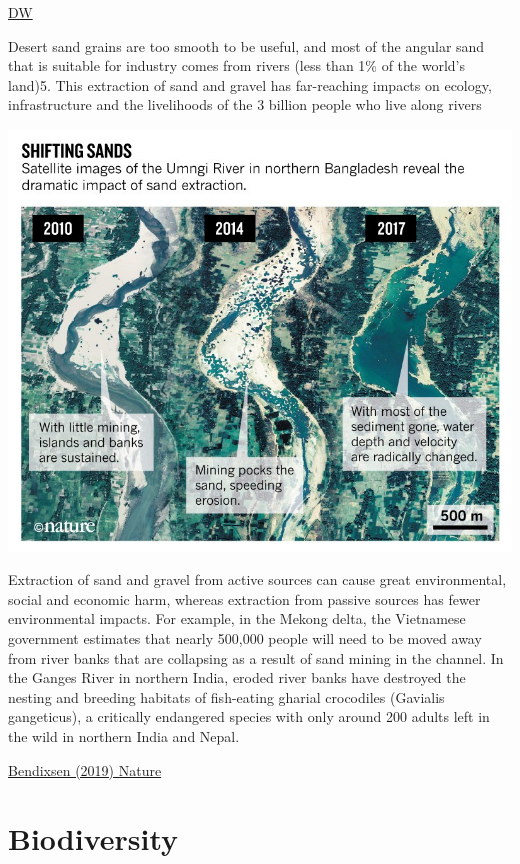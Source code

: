 \documentclass[
]{book}
\begin{document}
\href{https://www.dw.com/en/sand-crisis-shortage-supply-mafia/a-56714226}{DW}

Desert sand grains are too smooth to be useful, and most of the angular sand that is suitable for industry comes from rivers (less than 1\% of the world's land)5. This extraction of sand and gravel has far-reaching impacts on ecology, infrastructure and the livelihoods of the 3 billion people who live along rivers

\includegraphics{fig/sand_mining_bangladesh.jpg}

Extraction of sand and gravel from active sources can cause great environmental, social and economic harm, whereas extraction from passive sources has fewer environmental impacts. For example, in the Mekong delta, the Vietnamese government estimates that nearly 500,000 people will need to be moved away from river banks that are collapsing as a result of sand mining in the channel. In the Ganges River in northern India, eroded river banks have destroyed the nesting and breeding habitats of fish-eating gharial crocodiles (Gavialis gangeticus), a critically endangered species with only around 200 adults left in the wild in northern India and Nepal.

\href{https://www.nature.com/articles/d41586-019-02042-4}{Bendixsen (2019) Nature}

\hypertarget{biodiversity}{%
\chapter{Biodiversity}\label{biodiversity}}
\end{document}
